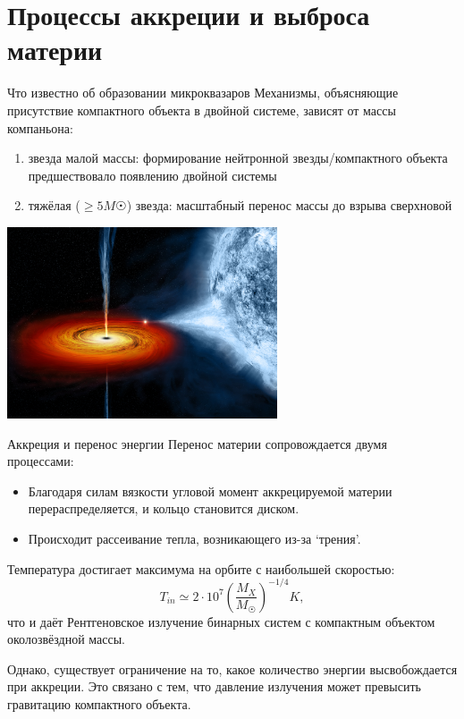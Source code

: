 \documentclass[8pt]{beamer}
\begin{document}
\section{Процессы аккреции и выброса материи}

\begin{frame}{Что известно об образовании микроквазаров}
    Механизмы, объясняющие присутствие компактного объекта в двойной системе, зависят от массы
    компаньона:
    \begin{enumerate}
        \item звезда малой массы: формирование нейтронной звезды/компактного объекта предшествовало появлению двойной системы
        \item тяжёлая ($\geq 5M\astrosun$) звезда: масштабный перенос массы до взрыва сверхновой
    \end{enumerate}
    \centering
    \includegraphics[width=0.6\textwidth]{resources/accretion-illustration.jpg}
\end{frame}

\begin{frame}{Аккреция и перенос энергии}
    Перенос материи сопровождается двумя процессами:
    \begin{itemize}
        \item Благодаря силам вязкости угловой момент аккрецируемой материи перераспределяется,
            и кольцо становится диском.\pause
        \item Происходит рассеивание тепла, возникающего из-за `трения'.\pause
    \end{itemize}
    Температура достигает максимума на орбите с наибольшей скоростью:
    \[
        T_{in} \simeq 2 \cdot 10^7 \left(\frac{M_X}{M_{\astrosun}}\right)^{-1/4} K,
    \]
    что и даёт Рентгеновское излучение бинарных систем с компактным объектом околозвёздной массы.
    
    Однако, существует ограничение на то, какое количество энергии высвобождается при аккреции.
    Это связано с тем, что давление излучения может превысить гравитацию компактного объекта.
\end{frame}
\end{document}
